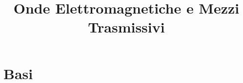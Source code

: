 

\title{Onde Elettromagnetiche e Mezzi Trasmissivi}


\maketitle
\tableofcontents

\section{Basi}







